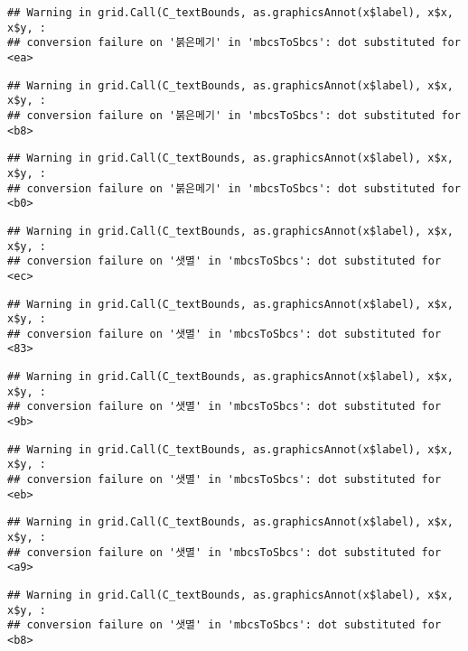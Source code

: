 \documentclass[
]{article}
\begin{document}
\begin{verbatim}
## Warning in grid.Call(C_textBounds, as.graphicsAnnot(x$label), x$x, x$y, :
## conversion failure on '붉은메기' in 'mbcsToSbcs': dot substituted for <ea>
\end{verbatim}

\begin{verbatim}
## Warning in grid.Call(C_textBounds, as.graphicsAnnot(x$label), x$x, x$y, :
## conversion failure on '붉은메기' in 'mbcsToSbcs': dot substituted for <b8>
\end{verbatim}

\begin{verbatim}
## Warning in grid.Call(C_textBounds, as.graphicsAnnot(x$label), x$x, x$y, :
## conversion failure on '붉은메기' in 'mbcsToSbcs': dot substituted for <b0>
\end{verbatim}

\begin{verbatim}
## Warning in grid.Call(C_textBounds, as.graphicsAnnot(x$label), x$x, x$y, :
## conversion failure on '샛멸' in 'mbcsToSbcs': dot substituted for <ec>
\end{verbatim}

\begin{verbatim}
## Warning in grid.Call(C_textBounds, as.graphicsAnnot(x$label), x$x, x$y, :
## conversion failure on '샛멸' in 'mbcsToSbcs': dot substituted for <83>
\end{verbatim}

\begin{verbatim}
## Warning in grid.Call(C_textBounds, as.graphicsAnnot(x$label), x$x, x$y, :
## conversion failure on '샛멸' in 'mbcsToSbcs': dot substituted for <9b>
\end{verbatim}

\begin{verbatim}
## Warning in grid.Call(C_textBounds, as.graphicsAnnot(x$label), x$x, x$y, :
## conversion failure on '샛멸' in 'mbcsToSbcs': dot substituted for <eb>
\end{verbatim}

\begin{verbatim}
## Warning in grid.Call(C_textBounds, as.graphicsAnnot(x$label), x$x, x$y, :
## conversion failure on '샛멸' in 'mbcsToSbcs': dot substituted for <a9>
\end{verbatim}

\begin{verbatim}
## Warning in grid.Call(C_textBounds, as.graphicsAnnot(x$label), x$x, x$y, :
## conversion failure on '샛멸' in 'mbcsToSbcs': dot substituted for <b8>
\end{verbatim}
\end{document}

